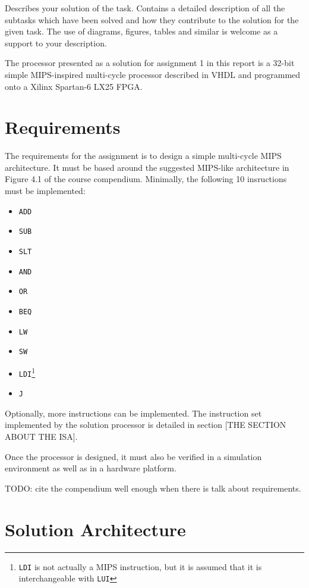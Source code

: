 Describes your solution of the task.
Contains a detailed description of all the subtasks which have been solved and how they contribute to the solution for the given task.
The use of diagrams, figures, tables and similar is welcome as a support to your description.

The processor presented as a solution for assignment 1 in this report is a 32-bit simple MIPS-inspired multi-cycle processor described in VHDL and programmed onto a Xilinx Spartan-6 LX25 FPGA.

\section{Requirements}

The requirements for the assignment is to design a simple multi-cycle MIPS architecture.
It must be based around the suggested MIPS-like architecture in Figure 4.1 of the course compendium\cite{compendium}.
Minimally, the following 10 insructions must be implemented:

\begin{itemize}

\item{\texttt{ADD}}
\item{\texttt{SUB}}
\item{\texttt{SLT}}
\item{\texttt{AND}}
\item{\texttt{OR}}
\item{\texttt{BEQ}}
\item{\texttt{LW}}
\item{\texttt{SW}}
\item{\texttt{LDI}\footnote{\texttt{LDI} is not actually a MIPS instruction, but it is assumed that it is interchangeable with \texttt{LUI}}}
\item{\texttt{J}}

\end{itemize}

Optionally, more instructions can be implemented.
The instruction set implemented by the solution processor is detailed in section [THE SECTION ABOUT THE ISA].

Once the processor is designed, it must also be verified in a simulation environment as well as in a hardware platform.

TODO: cite the compendium well enough when there is talk about requirements.

\section{Solution Architecture}

